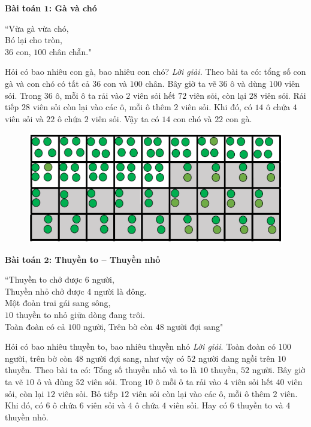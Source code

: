 \begin{multicols}{2}
	\vskip 0.1cm
	\textbf{\color{toancuabi}Bài toán $\pmb{1}$: Gà và chó}
	\begin{center}
		``Vừa gà vừa chó,\\
		Bó lại cho tròn,\\
		$36$ con, $100$ chân chẵn."
	\end{center}
	Hỏi có bao nhiêu con gà, bao nhiêu con chó?
	\vskip 0.1cm
	\textit{Lời giải.}
	Theo bài ta có: tổng số con gà và con chó có tất cả $36$ con và $100$ chân.
	\vskip 0.1cm
	Bây giờ ta vẽ $36$ ô và dùng $100$ viên sỏi. Trong $36$ ô, mỗi ô ta rải vào $2$ viên sỏi hết $72$ viên sỏi, còn lại $28$ viên sỏi. Rải tiếp $28$ viên sỏi còn lại vào các ô, mỗi ô thêm $2$ viên sỏi. Khi đó, có $14$ ô chứa $4$ viên sỏi và $22$ ô chứa $2$ viên sỏi. Vậy ta có $14$ con chó và $22$ con gà.
	\begin{figure}[H]
		\vspace*{-5pt}
		\centering
		\captionsetup{labelformat= empty, justification=centering}
		\includegraphics[width= 1\linewidth]{1}
		\vspace*{-15pt}
	\end{figure}
	\textbf{\color{toancuabi}Bài toán $\pmb2$: Thuyền to -- Thuyền nhỏ}
	\begin{center}
		``Thuyền to chở được $6$ người,\\
		Thuyền nhỏ chở được $4$ người là đông.\\
		Một đoàn trai gái sang sông,\\
		$10$ thuyền to nhỏ giữa dòng đang trôi.\\
		Toàn đoàn có cả $100$ người, Trên bờ còn $48$ người đợi sang"
	\end{center}
	Hỏi có bao nhiêu thuyền to, bao nhiêu thuyền nhỏ
	\vskip 0.1cm
	\textit{Lời giải}.
	Toàn đoàn có $100$ người, trên bờ còn $48$ người đợi sang, như vậy có $52$ người đang ngồi trên $10$ thuyền.
	\vskip 0.1cm
	Theo bài ta có: Tổng số thuyền nhỏ và to là $10$ thuyền, $52$ người.
	\vskip 0.1cm
	Bây giờ ta vẽ $10$ ô và dùng $52$ viên sỏi. Trong $10$ ô mỗi ô ta rải vào $4$ viên sỏi hết $40$ viên sỏi, còn lại $12$ viên sỏi. Bỏ tiếp $12$ viên sỏi còn lại vào các ô, mỗi ô thêm $2$ viên. Khi đó, có $6$ ô chứa $6$ viên sỏi và $4$ ô chứa $4$ viên sỏi. Hay có $6$ thuyền to và $4$ thuyền nhỏ.

\end{multicols}

